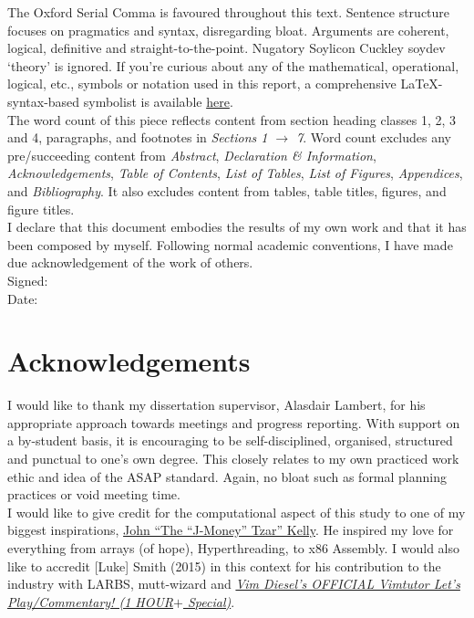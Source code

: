 \documentclass[11pt, english]{article}
\begin{document}
	The Oxford Serial Comma is favoured throughout this text. Sentence structure focuses on pragmatics and syntax, disregarding bloat. Arguments are coherent, logical, definitive and straight-to-the-point. Nugatory Soylicon Cuckley soydev `theory' is ignored. If you're curious about any of the mathematical, operational, logical, etc., symbols or notation used in this report, a comprehensive {\LaTeX}-syntax-based symbolist is available \href{http://lewisbritton.com/Library.html/Writings/Symbol-List.pdf}{here}.\\
 
	The word count of this piece reflects content from section heading classes 1, 2, 3 and 4, paragraphs, and footnotes in \textit{Sections 1 $\rightarrow$ 7}. Word count excludes any pre/succeeding content from \textit{Abstract}, \textit{Declaration \& Information}, \textit{Acknowledgements}, \textit{Table of Contents}, \textit{List of Tables}, \textit{List of Figures}, \textit{Appendices}, and \textit{Bibliography}. It also excludes content from tables, table titles, figures, and figure titles.\\

	I declare that this document embodies the results of my own work and that it has been composed by myself. Following normal academic conventions, I have made due acknowledgement of the work of others.\\

	Signed:\\ 

	Date:

\newpage

	\section*{Acknowledgements}

	I would like to thank my dissertation supervisor, Alasdair Lambert, for his appropriate approach towards meetings and progress reporting. With support on a by-student basis, it is encouraging to be self-disciplined, organised, structured and punctual to one's own degree. This closely relates to my own practiced work ethic and idea of the ASAP standard. Again, no bloat such as formal planning practices or void meeting time.\\

	I would like to give credit for the computational aspect of this study to one of my biggest inspirations, \href{http://lewisbritton.com/Blog/Founding-Fathers.html}{John ``The ``J-Money'' Tzar'' Kelly}. He inspired my love for everything from arrays (of hope), Hyperthreading, to x86 Assembly. I would also like to accredit [Luke] Smith (2015) in this context for his contribution to the industry with LARBS, mutt-wizard and \href{https://m.youtube.com/watch?v=d8XtNXutVto}{\textit{Vim Diesel's OFFICIAL Vimtutor Let's Play/Commentary! (1 HOUR$+$ Special)}}.\\
\end{document}
